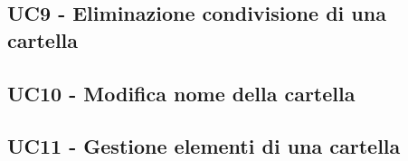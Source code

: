     \subsection{UC9 - Eliminazione condivisione di una cartella}

    \subsection{UC10 - Modifica nome della cartella}

    \subsection{UC11 - Gestione elementi di una cartella}